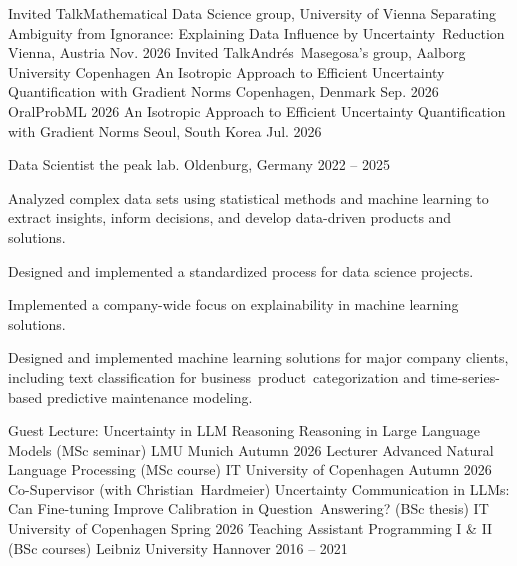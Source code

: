 \documentclass[11pt, a4paper]{awesome-cv}
\let\acvOrigSection\cvsection
\renewcommand{\cvsection}[1]{\Needspace*{4cm}\acvOrigSection{#1}}
\begin{document}
\begin{cventries}
  \cventry
    {Invited Talk{\enskip\cdotp\enskip}Mathematical Data Science group, University of Vienna}
    {Separating Ambiguity from Ignorance: Explaining Data Influence by Uncertainty~Reduction}
    {Vienna, Austria}
    {Nov. 2026}
    {}
  \vspace{2.5mm}
  \cventry
    {Invited Talk{\enskip\cdotp\enskip}Andrés~Masegosa's group, Aalborg University Copenhagen}
    {An Isotropic Approach to Efficient Uncertainty Quantification with Gradient Norms}
    {Copenhagen, Denmark}
    {Sep. 2026}
    {}
  \vspace{2.5mm}
  \cventry
    {Oral{\enskip\cdotp\enskip}ProbML 2026}
    {An Isotropic Approach to Efficient Uncertainty Quantification with Gradient Norms}
    {Seoul, South Korea}
    {Jul. 2026}
    {}
\end{cventries}

\begin{cventries}
  \cventry
    {Data Scientist}
    {the peak lab.}
    {Oldenburg, Germany}
    {2022 -- 2025}
    {
      \begin{cvitems}
        \item {Analyzed complex data sets using statistical methods and machine learning to extract insights, inform decisions, and develop data-driven products and solutions.}
        \item {Designed and implemented a standardized process for data science projects.}
        \item {Implemented a company-wide focus on explainability in machine learning solutions.}
        \item {Designed and implemented machine learning solutions for major company clients, including text classification for \mbox{business product categorization} and time-series-based predictive maintenance modeling.}
      \end{cvitems}
    }
\end{cventries}

\begin{cventries}
  \cventry
    {Guest Lecture: Uncertainty in LLM Reasoning}
    {Reasoning in Large Language Models (MSc seminar)}
    {LMU Munich}
    {Autumn 2026}
    {}
  \vspace{2.5mm}
  \cventry
    {Lecturer}
    {Advanced Natural Language Processing (MSc course)}
    {IT University of Copenhagen}
    {Autumn 2026}
    {}
  \vspace{2.5mm}
  \cventry
    {Co-Supervisor (with Christian~Hardmeier)}
    {Uncertainty Communication in LLMs: Can Fine-tuning Improve Calibration in Question~Answering? (BSc thesis)}
    {IT University of Copenhagen}
    {Spring 2026}
    {}
  \vspace{2.5mm}
  \cventry
    {Teaching Assistant}
    {Programming I \& II (BSc courses)}
    {Leibniz University Hannover}
    {2016 -- 2021}
    {}
\end{cventries}
\end{document}
